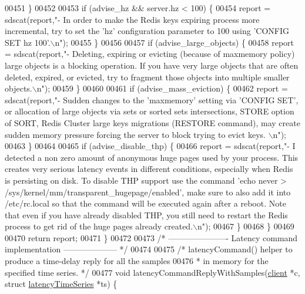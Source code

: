 \begin{DoxyCode}
{{{00451         \}
00452 
00453         \textcolor{keywordflow}{if} (advise\_hz && server.hz < 100) \{
00454             report = sdscat(report,\textcolor{stringliteral}{"- In order to make the Redis keys expiring process more
       incremental, try to set the 'hz' configuration parameter to 100 using 'CONFIG SET hz 100'.\(\backslash\)n"});
00455         \}
00456 
00457         \textcolor{keywordflow}{if} (advise\_large\_objects) \{
00458             report = sdscat(report,\textcolor{stringliteral}{"- Deleting, expiring or evicting (because of maxmemory policy)
       large objects is a blocking operation. If you have very large objects that are often deleted, expired, or
       evicted, try to fragment those objects into multiple smaller objects.\(\backslash\)n"});
00459         \}
00460 
00461         \textcolor{keywordflow}{if} (advise\_mass\_eviction) \{
00462             report = sdscat(report,\textcolor{stringliteral}{"- Sudden changes to the 'maxmemory' setting via 'CONFIG SET', or
       allocation of large objects via sets or sorted sets intersections, STORE option of SORT, Redis Cluster large
       keys migrations (RESTORE command), may create sudden memory pressure forcing the server to block trying to
       evict keys. \(\backslash\)n"});
00463         \}
00464 
00465         \textcolor{keywordflow}{if} (advise\_disable\_thp) \{
00466             report = sdscat(report,\textcolor{stringliteral}{"- I detected a non zero amount of anonymous huge pages used by
       your process. This creates very serious latency events in different conditions, especially when Redis is
       persisting on disk. To disable THP support use the command 'echo never >
       /sys/kernel/mm/transparent\_hugepage/enabled', make sure to also add it into /etc/rc.local so that the command will be executed again after a reboot.
       Note that even if you have already disabled THP, you still need to restart the Redis process to get rid of
       the huge pages already created.\(\backslash\)n"});
00467         \}
00468     \}
00469 
00470     \textcolor{keywordflow}{return} report;
00471 \}
00472 
00473 \textcolor{comment}{/* ---------------------- Latency command implementation -------------------- */}
00474 
00475 \textcolor{comment}{/* latencyCommand() helper to produce a time-delay reply for all the samples}
00476 \textcolor{comment}{ * in memory for the specified time series. */}
00477 \textcolor{keywordtype}{void} latencyCommandReplyWithSamples(\hyperlink{structclient}{client} *c, \textcolor{keyword}{struct} 
      \hyperlink{structlatencyTimeSeries}{latencyTimeSeries} *ts) \{
}}}
\end{DoxyCode}
